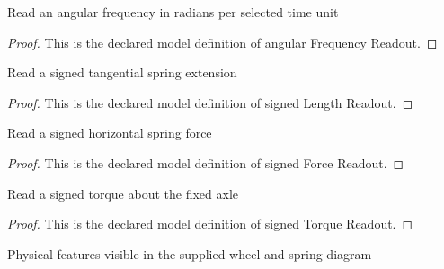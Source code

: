 \begin{definition}
  \label{def:physics:phyx-mini-0272:phyxminiproblems-problemphyxmini0272-angularfrequencyreadout}
  Read an angular frequency in radians per selected time unit
\end{definition}
\begin{proof}
  This is the declared model definition of angular Frequency Readout.
\end{proof}
\begin{definition}
  \label{def:physics:phyx-mini-0272:phyxminiproblems-problemphyxmini0272-signedlengthreadout}
  Read a signed tangential spring extension
\end{definition}
\begin{proof}
  This is the declared model definition of signed Length Readout.
\end{proof}
\begin{definition}
  \label{def:physics:phyx-mini-0272:phyxminiproblems-problemphyxmini0272-signedforcereadout}
  Read a signed horizontal spring force
\end{definition}
\begin{proof}
  This is the declared model definition of signed Force Readout.
\end{proof}
\begin{definition}
  \label{def:physics:phyx-mini-0272:phyxminiproblems-problemphyxmini0272-signedtorquereadout}
  Read a signed torque about the fixed axle
\end{definition}
\begin{proof}
  This is the declared model definition of signed Torque Readout.
\end{proof}
\begin{definition}
  \label{def:physics:phyx-mini-0272:phyxminiproblems-problemphyxmini0272-figurefeature}
  Physical features visible in the supplied wheel-and-spring diagram
\end{definition}
